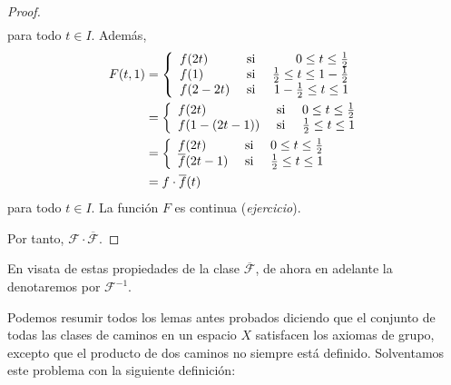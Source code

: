 \documentclass[12pt]{report}
\theoremstyle{largebreak}
\begin{document}
\begin{proof}
\begin{equation*}
\begin{split}
            \end{split}
        \end{equation*}
        para todo $t\in I$. Además,
        \begin{equation*}
            \begin{split}
                F(t,1)&=\left\{
                    \begin{array}{lcr}
                        f(2t) & \textup{ si } & 0\leq t\leq\frac{1}{2}\\
                        f(1) & \textup{ si } & \frac{1}{2}\leq t\leq1-\frac{1}{2}\\
                        f(2-2t) & \textup{ si } & 1-\frac{1}{2}\leq t\leq1\\
                    \end{array}
                \right.\\
                &=\left\{
                    \begin{array}{lcr}
                        f(2t) & \textup{ si } & 0\leq t\leq\frac{1}{2}\\
                        f(1-(2t-1)) & \textup{ si } & \frac{1}{2}\leq t\leq1\\
                    \end{array}
                \right.\\
                &=\left\{
                    \begin{array}{lcr}
                        f(2t) & \textup{ si } & 0\leq t\leq\frac{1}{2}\\
                        \overline{f}(2t-1) & \textup{ si } & \frac{1}{2}\leq t\leq1\\
                    \end{array}
                \right.\\
                &=f\cdot\overline{f}(t)\\
            \end{split}
        \end{equation*}
        para todo $t\in I$. La función $F$ es continua (\textit{ejercicio}).

        Por tanto, $\mathscr{F}\cdot\overline{\mathscr{F}}$.
    \end{proof}

    En visata de estas propiedades de la clase $\overline{\mathscr{F}}$, de ahora en adelante la denotaremos por $\mathscr{F}^{-1}$.

    Podemos resumir todos los lemas antes probados diciendo que el conjunto de todas las clases de caminos en un espacio $X$ satisfacen los axiomas de grupo, excepto que el producto de dos caminos no siempre está definido. Solventamos este problema con la siguiente definición:
\end{document}

